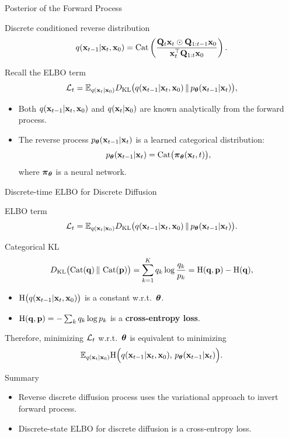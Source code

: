 \documentclass{beamer}
\begin{document}
\begin{frame}{Posterior of the Forward Process}
	\begin{block}{Discrete conditioned reverse distribution}
		\[
			q(\mathbf{x}_{t-1} | \mathbf{x}_t, \mathbf{x}_0)
			= \operatorname{Cat}\left(\frac{\mathbf{Q}_t \mathbf{x}_t \odot \mathbf{Q}_{1:t-1} \mathbf{x}_0}{\mathbf{x}_t^{\top}\mathbf{Q}_{1:t}\mathbf{x}_0}\right).
		\]
		\vspace{-0.3cm}
	\end{block}
	\eqpause
	Recall the ELBO term
	\[
		\mathcal{L}_t
		= \mathbb{E}_{q(\mathbf{x}_t | \mathbf{x}_0)}
		D_\mathrm{KL}\bigl(q(\mathbf{x}_{t-1} | \mathbf{x}_t, \mathbf{x}_0) \,\|\, p_{\boldsymbol{\theta}}(\mathbf{x}_{t-1} | \mathbf{x}_t)\bigr),
	\]
	\eqpause
	\vspace{-0.5cm}
	\begin{itemize}
		\item Both $q(\mathbf{x}_{t-1} | \mathbf{x}_t, \mathbf{x}_0)$ and $q(\mathbf{x}_t | \mathbf{x}_0)$ are known analytically from the forward process.
		\item The reverse process $p_{\boldsymbol{\theta}}(\mathbf{x}_{t-1} | \mathbf{x}_t)$ is a learned categorical distribution:
		\[
			p_{\boldsymbol{\theta}}(\mathbf{x}_{t-1} | \mathbf{x}_t) = \operatorname{Cat}\bigl( \boldsymbol{\pi}_{\boldsymbol{\theta}}(\mathbf{x}_t, t) \bigr),
		\]
		where $\boldsymbol{\pi}_{\boldsymbol{\theta}}$ is a neural network.
	\end{itemize}
\end{frame}
\begin{frame}{Discrete-time ELBO for Discrete Diffusion}

	\begin{block}{ELBO term}
		\vspace{-0.3cm}
		\[
			\mathcal{L}_t
			= \mathbb{E}_{q(\mathbf{x}_t | \mathbf{x}_0)}
			D_\mathrm{KL}\bigl(q(\mathbf{x}_{t-1} | \mathbf{x}_t, \mathbf{x}_0) \,\|\, p_{\boldsymbol{\theta}}(\mathbf{x}_{t-1} | \mathbf{x}_t)\bigr).
		\]
		\vspace{-0.3cm}
	\end{block}
	\eqpause
	\begin{block}{Categorical KL}
		\vspace{-0.3cm}
		\[
			D_\mathrm{KL}\bigl(\operatorname{Cat}(\mathbf{q}) \,\|\, \operatorname{Cat}(\mathbf{p})\bigr)
			= \sum_{k=1}^K q_k \log \frac{q_k}{p_k}
			= \mathrm{H}(\mathbf{q},\mathbf{p}) - \mathrm{H}(\mathbf{q}),
		\]
		\eqpause
		\begin{itemize}
			\item $\mathrm{H}\bigl(q(\mathbf{x}_{t-1} | \mathbf{x}_t, \mathbf{x}_0)\bigr)$ is a constant w.r.t.~$\boldsymbol{\theta}$.
			\item $\mathrm{H}(\mathbf{q},\mathbf{p}) = -\sum_k q_k \log p_k$ is a \textbf{cross-entropy loss}.
		\end{itemize}
	\end{block}
	\eqpause
	Therefore, minimizing $\mathcal{L}_t$ w.r.t.~$\boldsymbol{\theta}$ is equivalent to minimizing
	\[
		\mathbb{E}_{q(\mathbf{x}_t | \mathbf{x}_0)}
		\mathrm{H}\Bigl(q(\mathbf{x}_{t-1} | \mathbf{x}_t, \mathbf{x}_0),\, p_{\boldsymbol{\theta}}(\mathbf{x}_{t-1} | \mathbf{x}_t)\Bigr).
	\]
\end{frame}
\begin{frame}{Summary}
	\begin{itemize}
		\item Reverse discrete diffusion process uses the variational approach to invert forward process.
		\vfill 
		\item Discrete-state ELBO for discrete diffusion is a cross-entropy loss. 
	\end{itemize}
\end{frame}
\end{document}
